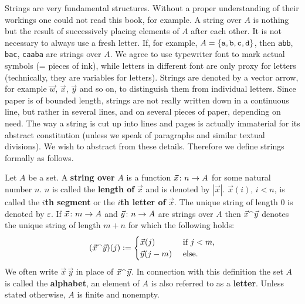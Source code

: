Strings are very fundamental structures. Without a proper
understanding of their workings one could not read this
book, for example. A string over $A$ is nothing but the result
of successively placing elements of $A$ after each other. It
is not necessary to always use a fresh letter. If, for example,
$A = \{\mbox{\tt a}, \mbox{\tt b}, \mbox{\tt c}, \mbox{\tt d}\}$,
then {\tt abb}, {\tt bac}, {\tt caaba} are strings over $A$.
We agree to use typewriter font to mark actual symbols (= pieces
of ink), while letters in different font are only proxy for
letters (technically, they are variables for letters). Strings
are denoted by a vector arrow, for example $\vec{w}$, $\vec{x}$,
$\vec{y}$ and so on, to distinguish them from individual letters.
Since paper is of bounded length, strings are not really written
down in a continuous line, but rather in several lines, and
on several pieces of paper, depending on need. The way a string is
cut up into lines and pages is actually immaterial for its
abstract constitution (unless we speak of paragraphs and similar
textual divisions). We wish to abstract from these details.
Therefore we define strings formally as follows.
\begin{defn}
Let $A$ be a set. A \textbf{string over} $A$ is a function
$\vec{x} \colon n \rightarrow A$ for some natural number $n$. $n$ is called
the \textbf{length of} 
$\vec{x}$ and is denoted by $|\vec{x}|$.
$\vec{x}(i)$, $i < n$, is called the $i$\textbf{th segment} or
the $i$\textbf{th letter of} $\vec{x}$. The unique string
of length 0 is denoted by $\varepsilon$. If $\vec{x} \colon m \rightarrow A$ and
$\vec{y} \colon n \rightarrow A$ are strings over $A$ then 
$\vec{x}{^{\smallfrown}}\vec{y}$ denotes the unique string of 
length $m+n$ for which the following holds:
\begin{equation}
(\vec{x}{^{\smallfrown}}\vec{y})(j) := 
\begin{cases}
    \vec{x}(j) & \text{ if $j < m$,}  \\
    \vec{y}(j - m) & \text{ else.}
\end{cases}
\end{equation}
We often write $\vec{x}\, \vec{y}$ in place of $\vec{x}{^{\smallfrown}}\vec{y}$.
In connection with this definition the set $A$ is called the
\textbf{alphabet}, an element of $A$ is also referred to as a 
\textbf{letter}. Unless stated otherwise, $A$ is finite and nonempty.
\end{defn}
